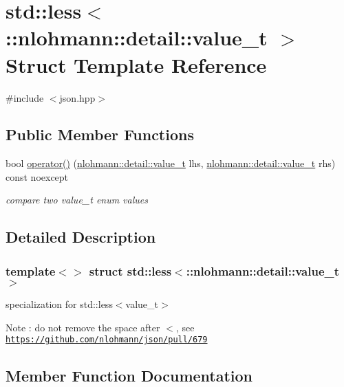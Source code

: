 \hypertarget{structstd_1_1less_3_1_1nlohmann_1_1detail_1_1value__t_01_4}{}\section{std\+:\+:less$<$\+:\+:nlohmann\+:\+:detail\+:\+:value\+\_\+t $>$ Struct Template Reference}
\label{structstd_1_1less_3_1_1nlohmann_1_1detail_1_1value__t_01_4}


{\ttfamily \#include $<$json.\+hpp$>$}

\subsection*{Public Member Functions}
\begin{DoxyCompactItemize}
\item 
bool \mbox{\hyperlink{structstd_1_1less_3_1_1nlohmann_1_1detail_1_1value__t_01_4_a10d3fea50edf7b15ead8f4ceeb006000}{operator()}} (\mbox{\hyperlink{namespacenlohmann_1_1detail_a1ed8fc6239da25abcaf681d30ace4985}{nlohmann\+::detail\+::value\+\_\+t}} lhs, \mbox{\hyperlink{namespacenlohmann_1_1detail_a1ed8fc6239da25abcaf681d30ace4985}{nlohmann\+::detail\+::value\+\_\+t}} rhs) const noexcept
\begin{DoxyCompactList}\small\item\em compare two value\+\_\+t enum values \end{DoxyCompactList}\end{DoxyCompactItemize}


\subsection{Detailed Description}
\subsubsection*{template$<$$>$\newline
struct std\+::less$<$\+::nlohmann\+::detail\+::value\+\_\+t $>$}

specialization for std\+::less$<$value\+\_\+t$>$ \begin{DoxyNote}{Note}
\+: do not remove the space after \textquotesingle{}$<$\textquotesingle{}, see \href{https://github.com/nlohmann/json/pull/679}{\tt https\+://github.\+com/nlohmann/json/pull/679} 
\end{DoxyNote}


\subsection{Member Function Documentation}
\mbox{\label{structstd_1_1less_3_1_1nlohmann_1_1detail_1_1value__t_01_4_a10d3fea50edf7b15ead8f4ceeb006000}} 
